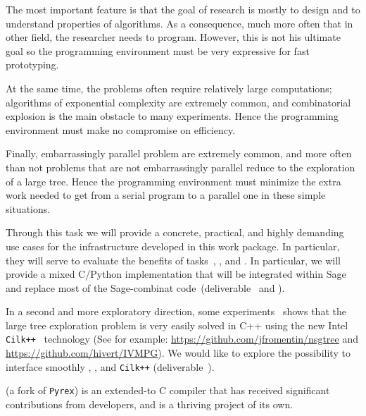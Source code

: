 \begin{workpackage}
\begin{tasklist}
\begin{task}[title=HPC infrastructure for combinatorics,id=hpc-combi,PM=26,lead=PS,partners={UB}]
  The most important feature is that the goal of research is mostly to
  design and to understand properties of algorithms. As a consequence,
  much more often that in other field, the researcher needs to
  program. However, this is not his ultimate goal so the programming
  environment must be very expressive for fast prototyping.

  At the same time, the problems often require relatively large
  computations; algorithms of exponential complexity are extremely
  common, and combinatorial explosion is the main obstacle to many
  experiments. Hence the programming environment must make no
  compromise on efficiency.

  Finally, embarrassingly parallel problem are extremely common, and
  more often than not problems that are not embarrassingly parallel
  reduce to the exploration of a large tree. Hence the programming
  environment must minimize the extra work needed to get from a serial
  program to a parallel one in these simple situations.

  Through this task we will provide a concrete, practical, and highly
  demanding use cases for the infrastructure developed in this work
  package. In particular, they will serve to evaluate the benefits of
  tasks~,
  , and
  .
  In particular, we will provide a mixed C/Python implementation that
  will be integrated within Sage and replace most of the Sage-combinat
  code~(deliverable~ 
  and ).

  In a second and more exploratory direction, some
  experiments~\cite{FromentinHivert} shows that the large tree exploration
  problem is very easily solved in C++ using the new Intel
  \texttt{Cilk++}~\cite{CilkIntel,CilkRefman} technology (See for example:
  \href{https://github.com/jfromentin/nsgtree}{https://github.com/jfromentin/nsgtree}
  and
  \href{https://github.com/hivert/IVMPG}{https://github.com/hivert/IVMPG}). We
  would like to explore the possibility to interface smoothly \Pythran,
  \Cython, and \texttt{Cilk++} (deliverable~).
\end{task}

\begin{task}[title=Pythran,id=pythran,lead=LL,partners={UJF},PM=24, wphases=0-24]
  \Cython (a fork of \texttt{Pyrex}) is an extended-\Python to C
  compiler that has received significant contributions from \Sage
  developers, and is a thriving project of its own.


\end{task}
\end{tasklist}
\end{workpackage}

